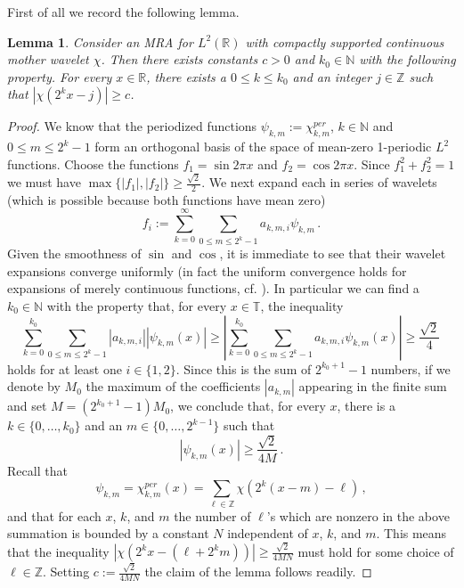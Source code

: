 \documentclass[11pt,reqno]{amsart}
\newcommand{\R}{\mathbb R}
\newcommand{\Z}{{\mathbb Z}}
\newtheorem{lemma}[theorem]{Lemma}
\theoremstyle{definition}
\numberwithin{equation}{section}
\begin{document}
First of all we record the following lemma.

\begin{lemma}\label{l:separation}
Consider an MRA for $L^2 (\mathbb R)$ with compactly supported continuous mother wavelet $\chi$. Then there exists constants $c>0$ and $k_0\in \mathbb N$ with the following property. For every $x\in\R$, there exists a $0\le k\le k_0$ and an integer $j\in\Z$ such that $|\chi (2^kx-j)|\ge c$.
\end{lemma}
\begin{proof}
We know that the periodized functions $\psi_{k,m} := \chi^{per}_{k,m}$, $k\in \mathbb N$ and $0\le m\le 2^k-1$
form an orthogonal basis of the space of mean-zero 1-periodic $L^2$ functions. Choose the functions $f_1=\sin 2\pi x$ and $f_2=\cos 2\pi x$. Since $f_1^2+f_2^2=1$ we must have
$\max \{|f_1|, |f_2|\} \ge \frac{\sqrt{2}}{2}$. We next expand each in series of wavelets (which is possible because both functions have mean zero)
\[
f_i := \sum_{k=0}^\infty \sum_{0\leq m \leq 2^k-1} a_{k,m , i} \psi_{k, m}\, .
\]
Given the smoothness of $\sin$ and $\cos$, it is immediate to see that their wavelet expansions converge uniformly (in fact the uniform convergence holds for expansions of merely continuous functions, cf. \cite[Theorem 9.3.1]{Dau92}).
In particular we can find a $k_0\in \mathbb N$ with the property that, for every $x\in \mathbb T$, the inequality
\[
\sum_{k=0}^{k_0} \sum_{0\leq m \leq 2^k-1} |a_{k, m , i}| |\psi_{k, m} (x) |
\geq \left|\sum_{k=0}^{k_0} \sum_{0\leq m \leq 2^k-1} a_{k,m, i} \psi_{k, m} (x)\right| 
\geq \frac{\sqrt{2}}{4}\, 
\]
holds for at least one $i\in \{1,2\}$. Since this is the sum of $2^{k_0+1}-1$ numbers, if we denote by $M_0$ the maximum of the coefficients $|a_{k,m}|$ appearing in the finite sum and set $M= (2^{k_0+1} -1) M_0$, we conclude that, for every $x$, there is a $k\in \{0, \ldots , k_0\}$ and an $m\in \{0, \ldots, 2^{k-1}\}$ such that 
\[
|\psi_{k,m} (x)| \geq \frac{\sqrt{2}}{4M}\, .
\]
Recall that 
\[
\psi_{k,m} = \chi^{per}_{k,m} (x) = \sum_{\ell \in \mathbb Z} \chi (2^k (x-m) -\ell)\, ,
\]
and that for each $x$, $k$, and $m$ the number of $\ell$'s which are nonzero in the above summation is bounded by a constant $N$ independent of $x$, $k$, and $m$. This means that the inequality 
$|\chi (2^k x - (\ell + 2^k m))| \geq \frac{\sqrt{2}}{4MN}$ must hold for some choice of $\ell \in \mathbb Z$. Setting $c:= \frac{\sqrt{2}}{4MN}$ the claim of the lemma follows readily. %
\end{proof}
\end{document}
